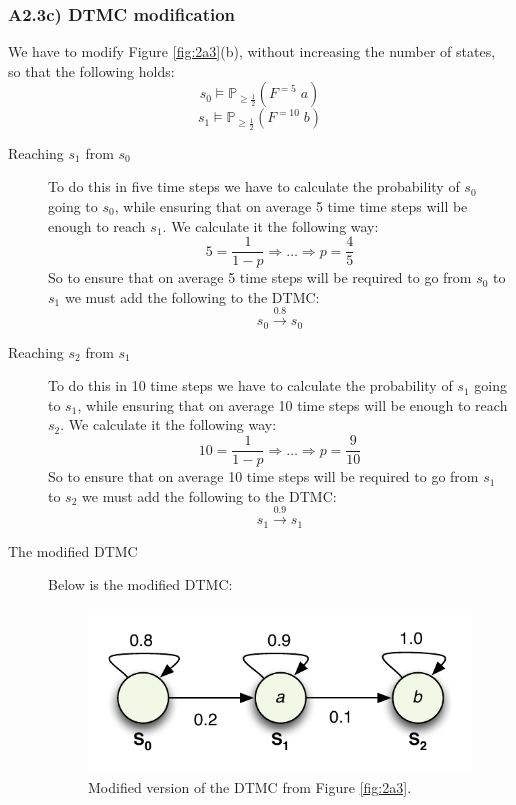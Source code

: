 \documentclass[12pt]{report}
\begin{document}
\subsubsection*{A2.3c) DTMC modification}
We have to modify Figure \ref{fig:2a3}(b), without increasing the number of states, so that the following holds:
$$s_0 \models \mathbb{P}_{\geq \frac{1}{2}}(F^{=5}\; a)$$
$$s_1 \models \mathbb{P}_{\geq \frac{1}{2}}(F^{=10}\; b)$$

\begin{description}
	\item[Reaching $s_1$ from $s_0$] To do this in five time steps we have to calculate the probability of $s_0$ going to $s_0$, while ensuring that on average 5 time time steps will be enough to reach $s_1$. We calculate it the following way:
	$$5 = \frac{1}{1-p} \Rightarrow \ldots \Rightarrow p = \frac{4}{5}$$
	So to ensure that on average 5 time steps will be required to go from $s_0$ to $s_1$ we must add the following to the DTMC:
	$$s_0 \xrightarrow{0.8} s_0$$
	
	\item[Reaching $s_2$ from $s_1$] To do this in 10 time steps we have to calculate the probability of $s_1$ going to $s_1$, while ensuring that on average 10 time steps will be enough to reach $s_2$. We calculate it the following way:
	$$10 = \frac{1}{1-p} \Rightarrow \ldots \Rightarrow p = \frac{9}{10}$$
	So to ensure that on average 10 time steps will be required to go from $s_1$ to $s_2$ we must add the following to the DTMC:
	$$s_1 \xrightarrow{0.9} s_1$$
	
	\item[The modified DTMC] Below is the modified DTMC:
	\begin{figure}[H]
		\begin{center}
		\includegraphics[scale=.85]{../GFX/Answer-A2-3c.pdf}
		\end{center}
		\caption{Modified version of the DTMC from Figure \ref{fig:2a3}.}
	\end{figure}
\end{description}
\end{document}

